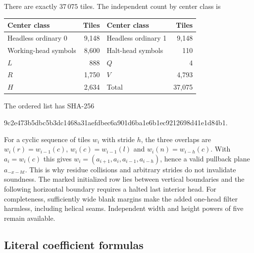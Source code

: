 \documentclass[11pt,a4paper]{article}
\theoremstyle{remark}
\begin{document}
There are exactly $37\,075$ tiles.  The independent count by center
class is
\begin{center}
\begin{tabular}{@{}lr@{\qquad}lr@{}}
\toprule
Center class & Tiles & Center class & Tiles\\\midrule
Headless ordinary 0 & 9,148 & Headless ordinary 1 & 9,148\\
Working-head symbols & 8,600 & Halt-head symbols & 110\\
$L$ & 888 & $Q$ & 4\\
$R$ & 1,750 & $V$ & 4,793\\
$H$ & 2,634 & Total & 37,075\\\bottomrule
\end{tabular}
\end{center}
The ordered list has SHA-256
\begin{center}\small\ttfamily
9c2e473b5dbc5b3dc1468a31aefdbec6a901d6ba1e6b1ec9212698d41e1d84b1.
\end{center}

For a cyclic sequence of tiles $w_i$ with stride $h$, the three overlaps
are $w_i(r)=w_{i-1}(c)$, $w_i(c)=w_{i-1}(l)$ and
$w_i(n)=w_{i-h}(c)$.  With $a_i=w_i(c)$ this gives
$w_i=(a_{i+1},a_i,a_{i-1},a_{i-h})$, hence a valid pullback plane
$a_{-x-ht}$.  This is why residue collisions and arbitrary strides do
not invalidate soundness.  The marked initialized row lies between
vertical boundaries and the following horizontal boundary requires a
halted last interior head.  For completeness, sufficiently wide blank
margins make the added one-head filter harmless, including helical
seams.  Independent width and height powers of five remain available.

\subsection{Literal coefficient formulas}
\end{document}
